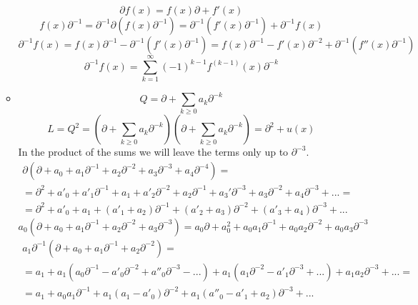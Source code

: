 \documentclass[12pt]{article}
\theoremstyle{definition}
\begin{document}
\begin{enumerate}
\begin{itemize}
        \begin{equation}
            \partial f(x)=f(x)\partial+f'(x)
        \end{equation}
        \begin{equation}
            f(x)\partial^{-1}=\partial^{-1}\partial(f(x)\partial^{-1})=\partial^{-1}(f'(x)\partial^{-1})+\partial^{-1}f(x)
        \end{equation}
        \begin{equation}
            \partial^{-1}f(x)=f(x)\partial^{-1}-\partial^{-1}(f'(x)\partial^{-1})=f(x)\partial^{-1}-f'(x)\partial^{-2}+\partial^{-1}(f''(x)\partial^{-1})
        \end{equation}
        \begin{equation}
            \boxed{\partial^{-1}f(x)=\sum\limits_{k=1}^\infty(-1)^{k-1}f^{(k-1)}(x)\partial^{-k}}
        \end{equation}
        \item
        \begin{equation}
            Q=\partial+\sum\limits_{k\geq0}a_k\partial^{-k}
        \end{equation}
        \begin{equation}
            L=Q^2=\left(\partial+\sum\limits_{k\geq0}a_k\partial^{-k}\right)\left(\partial+\sum\limits_{k\geq0}a_k\partial^{-k}\right)=\partial^2+u(x)
        \end{equation}
        In the product of the sums we will leave the terms only up to $\partial^{-3}$.
        \begin{multline}
            \partial(\partial+a_0+a_1\partial^{-1}+a_2\partial^{-2}+a_3\partial^{-3}+a_4\partial^{-4})=\\=\partial^2+a'_0+a'_1\partial^{-1}+a_1+a'_2\partial^{-2}+a_2\partial^{-1}+a_3'\partial^{-3}+a_3\partial^{-2}+a_4\partial^{-3}+...=\\=\partial^2+a'_0+a_1+(a'_1+a_2)\partial^{-1}+(a'_2+a_3)\partial^{-2}+(a'_3+a_4)\partial^{-3}+...
        \end{multline}
        \begin{equation}
            a_0(\partial+a_0+a_1\partial^{-1}+a_2\partial^{-2}+a_3\partial^{-3})=a_0\partial+a_0^2+a_0a_1\partial^{-1}+a_0a_2\partial^{-2}+a_0a_3\partial^{-3}
        \end{equation}
        \begin{multline}
            a_1\partial^{-1}(\partial+a_0+a_1\partial^{-1}+a_2\partial^{-2})=\\=a_1+a_1(a_0\partial^{-1}-a'_0\partial^{-2}+a''_0\partial^{-3}-...)+a_1(a_1\partial^{-2}-a'_1\partial^{-3}+...)+a_1a_2\partial^{-3}+...=\\=a_1+a_0a_1\partial^{-1}+a_1(a_1-a'_0)\partial^{-2}+a_1(a''_0-a'_1+a_2)\partial^{-3}+...

\end{multline}
\end{itemize}
\end{enumerate}
\end{document}
